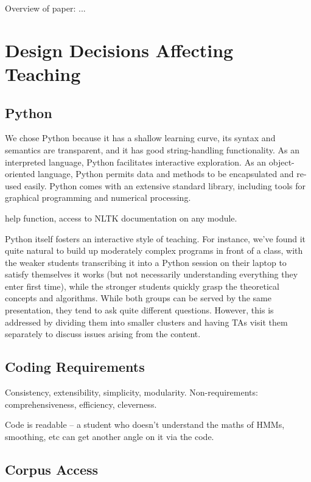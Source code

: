 \documentclass[11pt]{article}
\begin{document}
Overview of paper: ...

\section{Design Decisions Affecting Teaching}

\subsection{Python}

We chose Python because it has a shallow learning curve, its syntax
and semantics are transparent, and it has good string-handling
functionality.  As an interpreted language, Python facilitates
interactive exploration.  As an object-oriented language, Python
permits data and methods to be encapsulated and re-used easily.  Python comes with an extensive
standard library, including tools for graphical programming and
numerical processing.

help function, access to NLTK documentation on any module.

Python itself fosters an
interactive style of teaching.  For instance, we've found it quite
natural to build up moderately complex programs in front of a class,
with the weaker students transcribing it into a Python session on
their laptop to satisfy themselves it works (but not necessarily
understanding everything they enter first time), while the stronger
students quickly grasp the theoretical concepts and algorithms.  While
both groups can be served by the same presentation, they tend to ask
quite different questions.  However, this is addressed by dividing
them into smaller clusters and having TAs visit them separately to
discuss issues arising from the content.

\subsection{Coding Requirements}

Consistency, extensibility, simplicity, modularity.
Non-requirements: comprehensiveness, efficiency, cleverness.
\cite{BirdLoper02}

Code is readable -- a student who doesn't understand the maths of HMMs,
smoothing, etc can get another angle on it via the code.

\subsection{Corpus Access}
\end{document}
